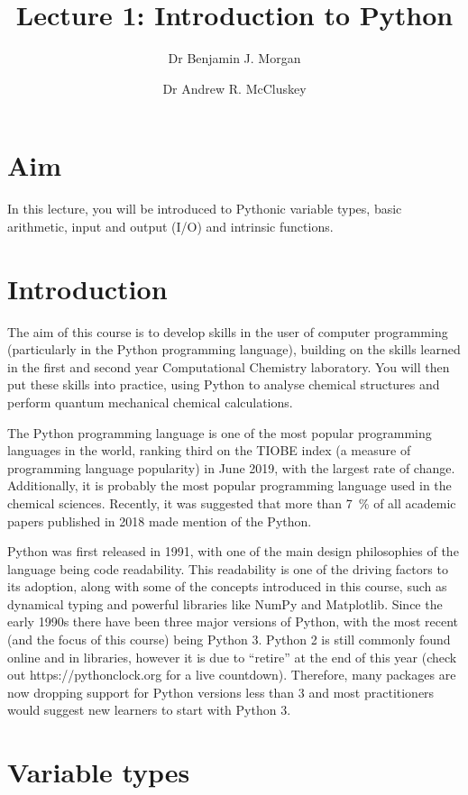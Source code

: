 \documentclass[a4paper]{article}
\title{Lecture 1: Introduction to Python}
\author[1]{Dr Benjamin J. Morgan}
\author[1,2]{Dr Andrew R. McCluskey}
\affil[1]{Department of Chemistry, University of Bath, email: b.j.morgan@bath.ac.uk}
\affil[2]{Diamond Light Source, email: andrew.mccluskey@diamond.ac.uk}
\begin{document}
\maketitle

\section*{Aim}
In this lecture, you will be introduced to Pythonic variable types, basic arithmetic, input and output (I/O) and intrinsic functions. 

\section{Introduction}

The aim of this course is to develop skills in the user of computer programming (particularly in the Python programming language), building on the skills learned in the first and second year Computational Chemistry laboratory. 
You will then put these skills into practice, using Python to analyse chemical structures and perform quantum mechanical chemical calculations. 

The Python programming language is one of the most popular programming languages in the world, ranking third on the TIOBE index (a measure of programming language popularity) in June 2019\cite{tiobe_index}, with the largest rate of change. 
Additionally, it is probably the most popular programming language used in the chemical sciences. 
Recently, it was suggested that more than \SI{7}{\percent} of all academic papers published in 2018 made mention of the Python. 

Python was first released in 1991, with one of the main design philosophies of the language being code readability. 
This readability is one of the driving factors to its adoption, along with some of the concepts introduced in this course, such as dynamical typing and powerful libraries like NumPy and Matplotlib. 
Since the early 1990s there have been three major versions of Python, with the most recent (and the focus of this course) being Python 3. 
Python 2 is still commonly found online and in libraries, however it is due to ``retire'' at the end of this year (check out https://pythonclock.org for a live countdown). 
Therefore, many packages are now dropping support for Python versions less than 3 and most practitioners would suggest new learners to start with Python 3. 

\section{Variable types}



\end{document}
